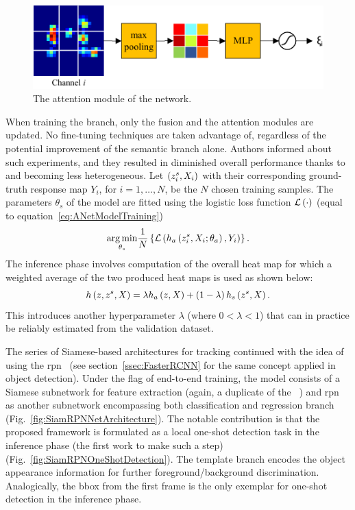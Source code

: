 \begin{figure}[t]
    \centerline{\includegraphics[width=0.6\linewidth]{figures/theoretical_foundations/twofold_siamese_net_attention_module.pdf}}
    \caption[ attention module]{The attention module of the  network. }
    \label{fig:TwofoldSiameseNetAttentionModule}
\end{figure}

When training the  branch, only the fusion and the attention modules are updated. No fine-tuning techniques are taken advantage of, regardless of the potential improvement of the semantic branch alone. Authors informed about such experiments, and they resulted in diminished overall performance thanks to  and  becoming less heterogeneous. Let $\left( {{z}_{i}^{s}, X_i} \right)$ with their corresponding ground-truth response map $Y_i$, for $i = 1, \dots, N$, be the $N$ chosen training samples. The parameters $\theta_s$ of the  model are fitted using the logistic loss function ${\mathcal{L}} \left( \cdot \right)$ (equal to equation~\ref{eq:ANetModelTraining})
\begin{equation}
    \label{eq:SNetModelTraining}
    \underset{\theta_s}{\operatorname*{arg\,min}}
    \frac{1}{N}
    \left\{ {
        {\mathcal{L}} \left( 
            {h_a} \left( {z}_{i}^{s}, X_i; \theta_a \right),
            Y_i
         \right)
    } \right\}.
\end{equation}
The inference phase involves computation of the overall heat map for which a weighted average of the two produced heat maps is used as shown below:
\begin{equation}
    {h} \left( z, z^s, X \right) = \lambda {h_a} \left( z, X \right) + \left( {1 - \lambda} \right) {h_s} \left( z^s, X \right).
\end{equation}
This introduces another hyperparameter $\lambda$ (where $0 < \lambda < 1$) that can in practice be reliably estimated from the validation dataset.

The series of Siamese-based architectures for tracking continued with the idea of using the \gls{rpn}~\cite{li2018siamrpn} (see section~\ref{ssec:FasterRCNN} for the same concept applied in object detection). Under the flag of end-to-end training, the  model consists of a Siamese subnetwork for feature extraction (again, a duplicate of the ~\cite{bertinetto2016siamfc}) and \gls{rpn} as another subnetwork encompassing both classification and regression branch (Fig.~\ref{fig:SiamRPNNetArchitecture}). The notable contribution is that the proposed framework is formulated as a local one-shot detection task in the inference phase (the first work to make such a step) (Fig.~\ref{fig:SiamRPNOneShotDetection}). The template branch encodes the object appearance information for further foreground/background discrimination. Analogically, the \gls{bbox} from the first frame is the only exemplar for one-shot detection in the inference phase.

